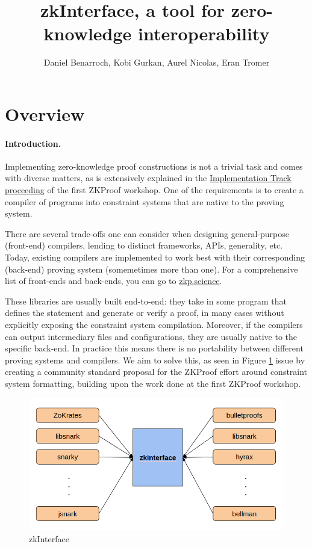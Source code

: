 \documentclass[a4paper,11pt]{article}
\title{zkInterface, a tool for zero-knowledge interoperability}
\author{Daniel Benarroch, Kobi Gurkan, Aurel Nicolas, Eran Tromer}
\begin{document}
		
		\maketitle
		

		\section{Overview}
		\paragraph{Introduction.} Implementing zero-knowledge proof constructions is not a trivial task and comes with diverse matters, as is extensively explained in the \href{https://zkproof.org/proceedings-snapshots/zkproof-implementation-20180801.pdf}{Implementation Track proceeding} of the first ZKProof workshop. One of the requirements is to create a compiler of programs into constraint systems that are native to the proving system.
		
		There are several trade-offs one can consider when designing general-purpose (front-end) compilers, lending to distinct frameworks, APIs, generality, etc. Today, existing compilers are implemented to work best with their corresponding (back-end) proving system (somemetimes more than one). For a comprehensive list of front-ends and back-ends, you can go to \href{https://zkp.science}{zkp.science}. 
		
		These libraries are usually built end-to-end: they take in some program that defines the statement and generate or verify a proof, in many cases without explicitly exposing the constraint system compilation. Moreover, if the compilers can output intermediary files and configurations, they are usually native to the specific back-end. In practice this means there is no portability between different proving systems and compilers. We aim to solve this, as seen in Figure \ref{interface} issue by creating a community standard proposal for the ZKProof effort around constraint system formatting, building upon the work done at the first ZKProof workshop.
		
		\begin{figure}[h!]
			\includegraphics[width=\linewidth]{interface.png}
			\caption{zkInterface}
			\label{interface}
		\end{figure}
\end{document}
